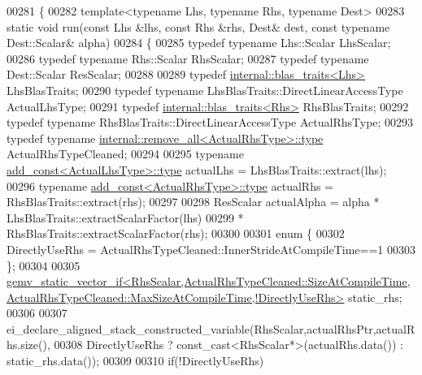 \begin{DoxyCode}
00281 \{
00282   \textcolor{keyword}{template}<\textcolor{keyword}{typename} Lhs, \textcolor{keyword}{typename} Rhs, \textcolor{keyword}{typename} Dest>
00283   \textcolor{keyword}{static} \textcolor{keywordtype}{void} run(\textcolor{keyword}{const} Lhs &lhs, \textcolor{keyword}{const} Rhs &rhs, Dest& dest, \textcolor{keyword}{const} \textcolor{keyword}{typename} Dest::Scalar& alpha)
00284   \{
00285     \textcolor{keyword}{typedef} \textcolor{keyword}{typename} Lhs::Scalar      LhsScalar;
00286     \textcolor{keyword}{typedef} \textcolor{keyword}{typename} Rhs::Scalar      RhsScalar;
00287     \textcolor{keyword}{typedef} \textcolor{keyword}{typename} Dest::Scalar     ResScalar;
00288     
00289     \textcolor{keyword}{typedef} \hyperlink{struct_eigen_1_1internal_1_1blas__traits}{internal::blas\_traits<Lhs>} LhsBlasTraits;
00290     \textcolor{keyword}{typedef} \textcolor{keyword}{typename} LhsBlasTraits::DirectLinearAccessType ActualLhsType;
00291     \textcolor{keyword}{typedef} \hyperlink{struct_eigen_1_1internal_1_1blas__traits}{internal::blas\_traits<Rhs>} RhsBlasTraits;
00292     \textcolor{keyword}{typedef} \textcolor{keyword}{typename} RhsBlasTraits::DirectLinearAccessType ActualRhsType;
00293     \textcolor{keyword}{typedef} \textcolor{keyword}{typename} \hyperlink{group___sparse_core___module}{internal::remove\_all<ActualRhsType>::type} 
      ActualRhsTypeCleaned;
00294 
00295     \textcolor{keyword}{typename} \hyperlink{group___core___module_class_eigen_1_1_transpose}{add\_const<ActualLhsType>::type} actualLhs = 
      LhsBlasTraits::extract(lhs);
00296     \textcolor{keyword}{typename} \hyperlink{group___core___module_class_eigen_1_1_transpose}{add\_const<ActualRhsType>::type} actualRhs = 
      RhsBlasTraits::extract(rhs);
00297 
00298     ResScalar actualAlpha = alpha * LhsBlasTraits::extractScalarFactor(lhs)
00299                                   * RhsBlasTraits::extractScalarFactor(rhs);
00300 
00301     \textcolor{keyword}{enum} \{
00302       DirectlyUseRhs = ActualRhsTypeCleaned::InnerStrideAtCompileTime==1
00303     \};
00304 
00305     
      \hyperlink{struct_eigen_1_1internal_1_1gemv__static__vector__if}{
      gemv\_static\_vector\_if<RhsScalar,ActualRhsTypeCleaned::SizeAtCompileTime,ActualRhsTypeCleaned::MaxSizeAtCompileTime,!DirectlyUseRhs>}
       static\_rhs;
00306 
00307     ei\_declare\_aligned\_stack\_constructed\_variable(RhsScalar,actualRhsPtr,actualRhs.size(),
00308         DirectlyUseRhs ? \textcolor{keyword}{const\_cast<}RhsScalar*\textcolor{keyword}{>}(actualRhs.data()) : static\_rhs.data());
00309 
00310     \textcolor{keywordflow}{if}(!DirectlyUseRhs)

\end{DoxyCode}
